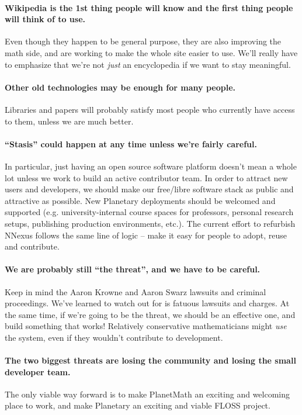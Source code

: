\paragraph{Wikipedia is the 1st thing people will know and the first thing
  people will think of to use.}  Even though they happen to be general
purpose, they are also improving the math side, and are working to
make the whole site easier to use.  We'll really have to emphasize
that we're not \emph{just} an encyclopedia if we want to stay
meaningful.

\paragraph{Other old technologies may be enough for many people.}  Libraries
and papers will probably satisfy most people who currently have access
to them, unless we are much better.

\paragraph{``Stasis'' could happen at any time unless we're fairly careful.}
In particular, just having an open source software platform doesn't
mean a whole lot unless we work to build an active contributor team.
In order to attract new users and developers, we should make our
free/libre software stack as public and attractive as possible.  New
Planetary deployments should be welcomed and supported
(e.g. university-internal course spaces for professors, personal
research setups, publishing production environments, etc.).  The
current effort to refurbish NNexus follows the same line of logic --
make it easy for people to adopt, reuse and contribute.

\paragraph{We are probably still ``the threat'', and we have to be careful.}
Keep in mind the Aaron Krowne and Aaron Swarz lawsuits and criminal
proceedings.  We've learned to watch out for is fatuous lawsuits and
charges.  At the same time, if we're going to be the threat, we should
be an effective one, and build something that works!  Relatively
conservative mathematicians might \emph{use} the system, even if they
wouldn't contribute to development.

\paragraph{The two biggest threats are losing the community and losing the
  small developer team.}  The only viable way forward is to make
PlanetMath an exciting and welcoming place to work, and make Planetary
an exciting and viable FLOSS project.

